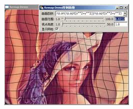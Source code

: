 \documentclass[compress=true]{beamer}
\begin{document}
\begin{frame}
\begin{columns}
\begin{column}{0.4\textwidth}
			\begin{figure}
				\includegraphics[height=0.3\textheight]{pyopencv.png}
			\end{figure}
		\end{column}
	\end{columns}
\end{frame}
\end{document}
